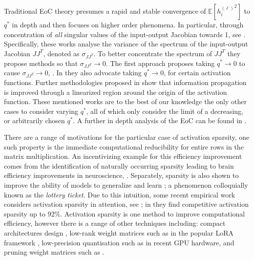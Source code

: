 \documentclass{article}
\theoremstyle{plain}
\theoremstyle{definition}
\theoremstyle{remark}
\begin{document}

Traditional EoC theory presumes a rapid and stable convergence of $\mathbb{E} \left[ {h_i^{(\ell)}}^2 \right]$ to $q^*$ in depth and then focuses on higher order phenomena. In particular, through concentration of \emph{all} singular values of the input-output Jacobian towards 1, see \cite{pennington_resurrecting_2017, pennington_emergence_2018, xiao_dynamical_2018}. Specifically, these works analyse the variance of the spectrum of the input-output Jacobian $JJ^T$, denoted as $\sigma_{JJ^T}$. To better concentrate the spectrum of $JJ^T$ they propose methods so that $\sigma_{JJ^T} \rightarrow 0$. The first approach proposes taking $q^* \rightarrow 0$ to cause $\sigma_{JJ^T} \rightarrow 0$, \cite{pennington_emergence_2018}. In \cite{martens_rapid_2021, roberts_principles_2022, murray_activation_2022} they also advocate taking $q^* \rightarrow 0$, for certain activation functions. Further methodologies proposed in \cite{murray_activation_2022, martens_rapid_2021} show that information propagation is improved through a linearized region around the origin of the activation function.  These mentioned works are to the best of our knowledge the only other cases to consider varying $q^*$, all of which only consider the limit of a decreasing, or arbitrarily chosen $q^*$. A further in depth analysis of the EoC can be found in \cite{yaida_non-gaussian_2020, roberts_principles_2022, hanin_random_2023}. %

 There are a range of motivations for the particular case of activation sparsity, one such property is the immediate computational reducibility for entire rows in the matrix multiplication. An incentivizing example for this efficiency improvement comes from the identification of naturally occurring sparsity leading to brain efficiency improvements in neuroscience, \cite{attwell_energy_2001}. Separately, sparsity is also shown to improve the ability of models to generalize and learn \cite{frankle_lottery_2018, muthukumar_sparsity-aware_2023, awasthi_learning_2024}; a phenomenon colloquially known as the \emph{lottery ticket}. Due to this intuition, some recent empirical work considers activation sparsity in attention, see \cite{zhang_relu2_2024, luo_sparsing_2025, you_spark_2025}; in \cite{you_spark_2025} they find competitive activation sparsity up to 92\%.  Activation sparsity is one method to improve computational efficiency, however there is a range of other techniques including: compact architectures design \cite{howard_mobilenets_2017}, low-rank weight matrices \cite{osawa_accelerating_2017} such as in the popular LoRA framework \cite{hu_lora_2021}, low-precision quantisation \cite{weng_neural_2023} such as in recent GPU hardware, and pruning weight matrices such as \cite{blalock_what_2020}.
\end{document}
